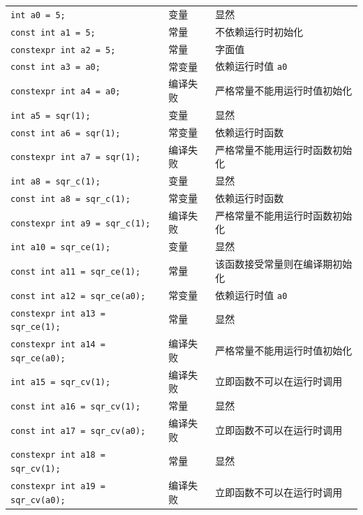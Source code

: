 \begin{longtable}[c]{lll}
    \texttt{int a0 = 5;}  & 变量 & 显然 \\
    \rowcolor{blue!15} \texttt{const int a1 = 5;}  & 常量 & 不依赖运行时初始化 \\
    \texttt{constexpr int a2 = 5;}  & 常量 & 字面值 \\
    \texttt{const int a3 = a0;}  & 常变量 & 依赖运行时值 \texttt{a0}  \\
    \rowcolor{red!15} \texttt{constexpr int a4 = a0;}  & 编译失败 & 严格常量不能用运行时值初始化 \\
    \texttt{int a5 = sqr(1);}  & 变量 & 显然 \\
    \texttt{const int a6 = sqr(1);}  & 常变量 & 依赖运行时函数 \\
    \rowcolor{red!15} \texttt{constexpr int a7 = sqr(1);}  & 编译失败 & 严格常量不能用运行时函数初始化 \\
    \texttt{int a8 = sqr\_c(1);}  & 变量 & 显然 \\
    \texttt{const int a8 = sqr\_c(1);}  & 常变量 & 依赖运行时函数 \\
    \rowcolor{red!15} \texttt{constexpr int a9 = sqr\_c(1);}  & 编译失败 & 严格常量不能用运行时函数初始化 \\
    \texttt{int a10 = sqr\_ce(1);}  & 变量 & 显然 \\
    \rowcolor{blue!15} \texttt{const int a11 = sqr\_ce(1);}  & 常量 & 该函数接受常量则在编译期初始化 \\
    \texttt{const int a12 = sqr\_ce(a0);}  & 常变量 & 依赖运行时值 \texttt{a0}  \\
    \texttt{constexpr int a13 = sqr\_ce(1);}  & 常量 & 显然 \\
    \rowcolor{red!15} \texttt{constexpr int a14 = sqr\_ce(a0);}  & 编译失败 & 严格常量不能用运行时值初始化 \\
    \rowcolor{red!15} \texttt{int a15 = sqr\_cv(1);}  & 编译失败 & 立即函数不可以在运行时调用 \\
    \rowcolor{blue!15} \texttt{const int a16 = sqr\_cv(1);}  & 常量 & 显然 \\
    \rowcolor{red!15} \texttt{const int a17 = sqr\_cv(a0);}  & 编译失败 & 立即函数不可以在运行时调用 \\
    \texttt{constexpr int a18 = sqr\_cv(1);}  & 常量 & 显然 \\
    \rowcolor{red!15} \texttt{constexpr int a19 = sqr\_cv(a0);}  & 编译失败 & 立即函数不可以在运行时调用 \\
\end{longtable}

